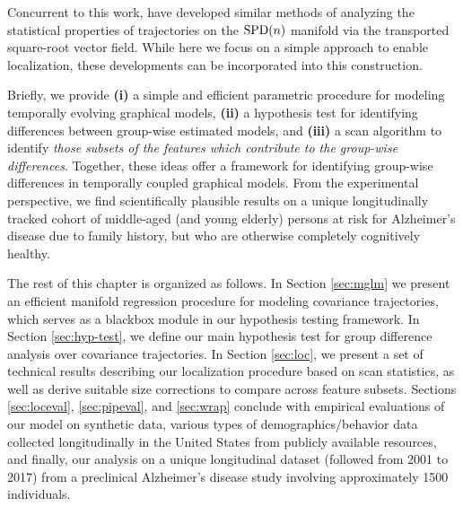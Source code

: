 
Concurrent to this work, \cite{su2014statistical,zhang2018rate} have developed similar methods of analyzing the statistical properties of trajectories on the $\text{SPD}(n)$ manifold via the transported square-root vector field. While here we focus on a simple approach to enable localization, these developments can be incorporated into this construction.

Briefly, we provide \textbf{(i)} a simple and efficient parametric procedure for modeling temporally evolving graphical models, \textbf{(ii)} a 
hypothesis test for identifying differences between group-wise estimated models, and \textbf{(iii)} a scan
algorithm to identify {\em those subsets of the features which contribute to the group-wise differences}.
Together, these ideas offer a framework for identifying group-wise differences in temporally coupled graphical models.
From the experimental perspective, we find scientifically plausible results on 
a unique longitudinally tracked cohort of middle-aged (and young elderly) persons at risk for Alzheimer's disease due to family history, 
but who are otherwise completely cognitively healthy.

The rest of this chapter is organized as follows. In Section \ref{sec:mglm} we present an efficient manifold regression procedure for 
modeling covariance trajectories, which serves as a blackbox module in our hypothesis testing framework. 
In Section \ref{sec:hyp-test}, we define our main hypothesis test for group difference analysis over covariance trajectories. 
In Section \ref{sec:loc}, we present a set of technical results describing our localization procedure based on scan statistics, 
as well as derive suitable size corrections to compare across feature subsets. Sections \ref{sec:loceval}, \ref{sec:pipeval}, and \ref{sec:wrap} conclude with
empirical evaluations of our model on synthetic data, various types of demographics/behavior data collected longitudinally 
in the United States from publicly available resources, and finally, our 
analysis on a unique longitudinal dataset (followed from 2001 to 2017) from a preclinical Alzheimer's disease study involving approximately 1500 individuals.
